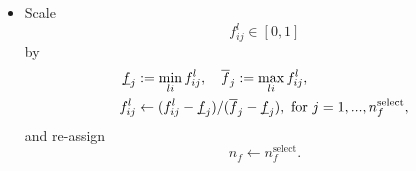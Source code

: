 \documentclass[12pt]{article}
\begin{document}
\begin{itemize}
	\item Scale
	\begin{equation}
		\label{eq:scale_1}
		f^l_{ij} \in [0, 1]
	\end{equation}
	by
	\begin{equation}
		\label{eq:scale_2}
		\begin{split}
			\underbar{$f$}_j &:= \min_{li} f^l_{ij}, ~~~ \overline{f}_j := \max_{li} f^l_{ij}, \\
			f^l_{ij} &\leftarrow (f^l_{ij} - \underbar{$f$}_j)/ (\overline{f}_j - \underbar{$f$}_j), \text{ for } j = 1,..., n_f^\text{select},
		\end{split}
	\end{equation}
	and re-assign
	\begin{equation}
		n_f \leftarrow n_f^\text{select}.
	\end{equation}
\end{itemize}
	
\end{document}
